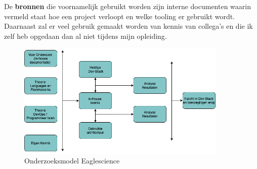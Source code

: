 De \textbf{bronnen} die voornamelijk gebruikt worden zijn interne documenten waarin vermeld staat hoe een project verloopt en welke tooling er gebruikt wordt. Daarnaast zal er veel gebruik gemaakt worden van kennis van collega's en die ik zelf heb opgedaan dan al niet tijdens mijn opleiding.
\begin{figure}[htbp]
    \myfloatalign
    \includegraphics[width=10cm]{gfx/OnderzoeksmodelES}
    \caption{Onderzoeksmodel Eaglescience}
    \label{fig:OnderzoeksModelEaglescience}
\end{figure}


\newpage %


